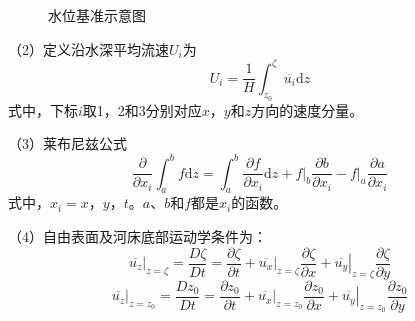\begin{figure}
  \begin{tikzpicture}
  \end{tikzpicture}
  \caption{水位基准示意图}
\end{figure}

（2）定义沿水深平均流速$U_i$为
\begin{equation}
  U_i
  =
  \frac{1}{H}
\int_{z_{0}}^{\zeta}\!\overline{u_{i}}\mathrm{d}z
\end{equation}
式中，下标$i$取1，2和3分别对应$x$，$y$和$z$方向的速度分量。

（3）莱布尼兹公式
\begin{equation}
  \frac{\partial}{\partial x_{i}}
  \int_{a}^{b}\!f\mathrm{d}z
  =
  \int_{a}^{b}\!
  \frac{\partial f}{\partial x_{i}}\mathrm{d}z
  +
  \left.f\right|_{b}\frac{\partial b}{\partial x_{i}}
  -
  \left.f\right|_{a}\frac{\partial a}{\partial x_{i}}
    \label{EqCGeLeibnizLaw}
\end{equation}
式中，$x_{i}=x$，$y$，$t$。$a$、$b$和$f$都是$x_{i}$的函数。

（4）自由表面及河床底部运动学条件为：
\begin{equation}
  \left.\overline{u_{z}}\right|_{z=\zeta}
    =
    \frac{D\zeta}{Dt}
    =
    \frac{\partial\zeta}{\partial t}
    +
    \left.\overline{u_{x}}\right|_{z=\zeta}\frac{\partial\zeta}{\partial x}
      +
    \left.\overline{u_{y}}\right|_{z=\zeta}\frac{\partial\zeta}{\partial y}
    \label{EqCGeSMC}
\end{equation}
\begin{equation}
  \left.\overline{u_{z}}\right|_{z=z_{0}}
    =
    \frac{Dz_{0}}{Dt}
    =
    \frac{\partial z_{0}}{\partial t}
    +
    \left.\overline{u_{x}}\right|_{z=z_{0}}\frac{\partial z_{0}}{\partial x}
      +
    \left.\overline{u_{y}}\right|_{z=z_{0}}\frac{\partial z_{0}}{\partial y}
    \label{EqCGeBMC}
\end{equation}

